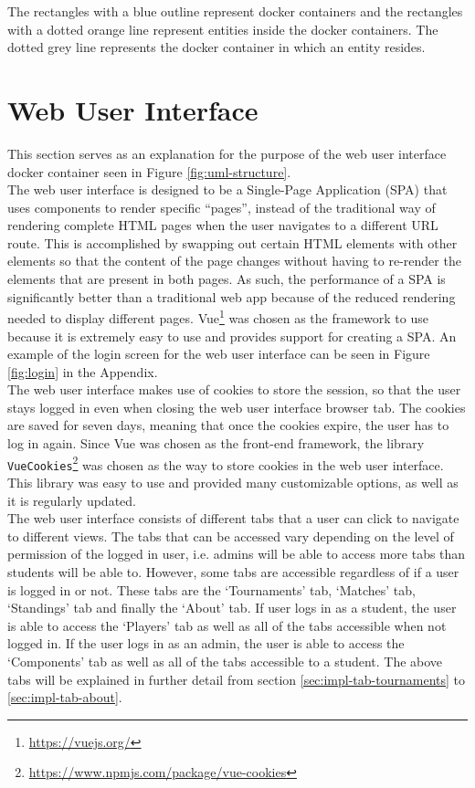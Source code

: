 \documentclass[a4paper, 12pt]{report}
\begin{document}
The rectangles with a blue outline represent docker containers and the rectangles
with a dotted orange line represent entities inside the docker containers. The
dotted grey line represents the docker container in which an entity resides.

\section{Web User Interface}
\label{sec:impl-web-interface}

This section serves as an explanation for the purpose of the web user interface
docker container seen in Figure \ref{fig:uml-structure}. \\

The web user interface is designed to be a Single-Page Application (SPA) that
uses components to render specific ``pages'', instead of the traditional way of
rendering complete HTML pages when the user navigates to a different URL route.
This is accomplished by swapping out certain HTML elements with other elements
so that the content of the page changes without having to re-render the elements
that are present in both pages. As such, the performance of a SPA is significantly
better than a traditional web app because of the reduced rendering needed to
display different pages. Vue\footnote{\url{https://vuejs.org/}} was chosen as the
framework to use because it is extremely easy to use and provides support for
creating a SPA. An example of the login screen for the web user interface can be
seen in Figure \ref{fig:login} in the Appendix. \\

The web user interface makes use of cookies to store the session, so that the
user stays logged in even when closing the web user interface browser tab. The
cookies are saved for seven days, meaning that once the cookies expire, the
user has to log in again. Since Vue was chosen as the front-end framework, the
library \texttt{VueCookies}\footnote{\url{https://www.npmjs.com/package/vue-cookies}}
was chosen as the way to store cookies in the web user interface. This library
was easy to use and provided many customizable options, as well as it is
regularly updated. \\

The web user interface consists of different tabs that a user can click to navigate
to different views. The tabs that can be accessed vary depending on the level of
permission of the logged in user, i.e. admins will be able to access more tabs
than students will be able to. However, some tabs are accessible regardless of
if a user is logged in or not. These tabs are the `Tournaments' tab, `Matches'
tab, `Standings' tab and finally the `About' tab. If user logs in as a student,
the user is able to access the `Players' tab as well as all of the tabs
accessible when not logged in. If the user logs in as an admin, the user is able
to access the `Components' tab as well as all of the tabs accessible to a student.
The above tabs will be explained in further detail from section
\ref{sec:impl-tab-tournaments} to \ref{sec:impl-tab-about}.
\end{document}
